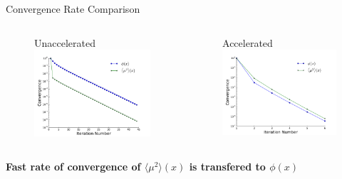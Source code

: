 \documentclass[10pt]{beamer}
\newcommand{\edd}{\langle \mu^2 \rangle}
\begin{document}
\begin{frame}{Convergence Rate Comparison}

	\begin{columns}
	\begin{column}{.5\paperwidth}
	\begin{figure} \centering
		Unaccelerated
		\includegraphics[width=.45\paperwidth]{figs/converge_una.pdf}
	\end{figure}
	\end{column}
	\pause
	\begin{column}{.5\paperwidth}
	\begin{figure} \centering
		Accelerated
		\includegraphics[width=.45\paperwidth]{figs/converge_acc.pdf}
	\end{figure}
	\end{column}
	\end{columns}

	\pause
	\vfill
	\centerline{\textbf{Fast rate of convergence of $\edd(x)$ is transfered to $\phi(x)$}}

\end{frame}
\end{document}
